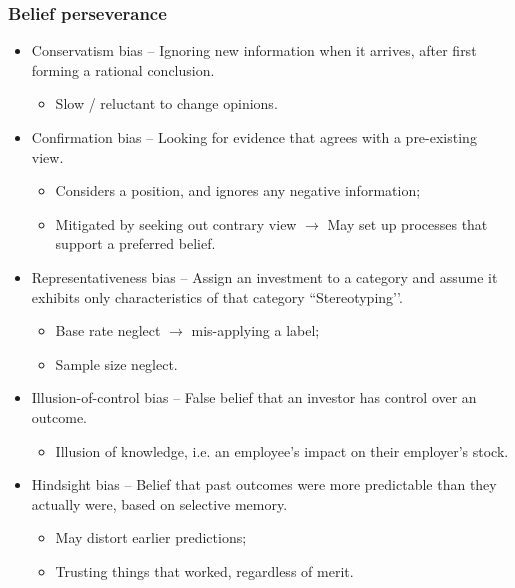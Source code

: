 \documentclass[../notes_compiled.tex]{subfiles}
\begin{document}
\begin{itemize}
\subsubsection*{Belief perseverance}
\begin{itemize}
\item Conservatism bias -- Ignoring new information when it arrives, after first forming a rational conclusion.
\begin{itemize}
\item Slow / reluctant to change opinions.
\end{itemize}
\item Confirmation bias -- Looking for evidence that agrees with a pre-existing view.
\begin{itemize}
\item Considers a position, and ignores any negative information;
\item Mitigated by seeking out contrary view $\rightarrow$ May set up processes that support a preferred belief.
\end{itemize}
\item Representativeness bias -- Assign an investment to a category and assume it exhibits only characteristics of that category ``Stereotyping’’.
\begin{itemize}
\item Base rate neglect $\rightarrow$ mis-applying a label;
\item Sample size neglect.
\end{itemize}
\item Illusion-of-control bias -- False belief that an investor has control over an outcome.
\begin{itemize}
\item Illusion of knowledge, i.e. an employee’s impact on their employer’s stock.
\end{itemize}
\item Hindsight bias -- Belief that past outcomes were more predictable than they actually were, based on selective memory.
\begin{itemize}
\item May distort earlier predictions;
\item Trusting things that worked, regardless of merit.
\end{itemize}
\end{itemize}


\end{itemize}
\end{document}
